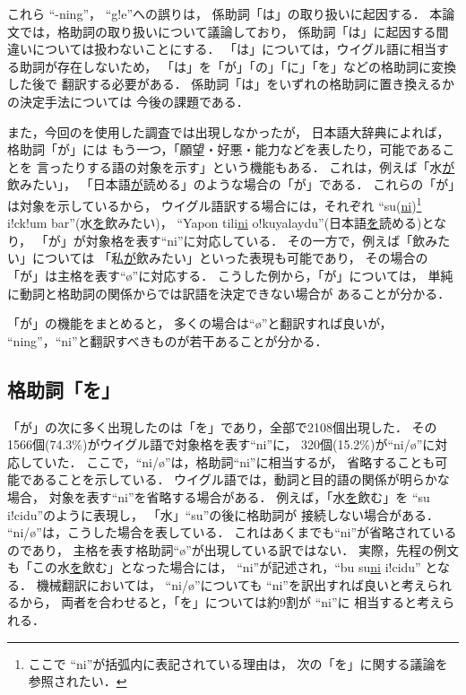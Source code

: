 これら ``-ning''， ``g!e''への誤りは，
係助詞「は」の取り扱いに起因する．
本論文では，格助詞の取り扱いについて議論しており，
係助詞「は」に起因する間違いについては扱わないことにする．
「は」については，ウイグル語に相当する助詞が存在しないため，
「は」を「が」「の」「に」「を」などの格助詞に変換した後で
翻訳する必要がある．
係助詞「は」をいずれの格助詞に置き換えるかの決定手法については
今後の課題である．

また，今回の\cite{IPAL}を使用した調査では出現しなかったが，
日本語大辞典\cite{GDIC}によれば，格助詞「が」には
もう一つ，「願望・好悪・能力などを表したり，可能であることを
言ったりする語の対象を示す」という機能もある．
これは，例えば「水\underline{が}飲みたい」，
「日本語\underline{が}読める」のような場合の「が」である．
これらの「が」は対象を示しているから，
ウイグル語訳する場合には，それぞれ
``su(\underline{ni})\footnote{ここで ``ni''が括弧内に表記されている理由は，
次の「を」に関する議論を参照されたい．}
 i!ck!um bar''(水\underline{を}飲みたい)，
``Yapon tili\underline{ni} 
o!kuyalaydu''(日本語\underline{を}読める)となり，
「が」が対象格を表す``ni''に対応している．
その一方で，例えば「飲みたい」については
「私\underline{が}飲みたい」といった表現も可能であり，
その場合の「が」は主格を表す``\o''に対応する．
こうした例から，「が」については，
単純に動詞と格助詞の関係からでは訳語を決定できない場合が
あることが分かる．

「が」の機能をまとめると，
多くの場合は``\o''と翻訳すれば良いが，
``ning''，``ni''と翻訳すべきものが若干あることが分かる．

\vspace{2pt}

\subsection{格助詞「を」}
\label{sec:wo}
「が」の次に多く出現したのは「を」であり，全部で2108個出現した．
その1566個(74.3\%)がウイグル語で対象格を表す``ni''に，
320個(15.2\%)が``ni/\o''に対応していた．
ここで，``ni/\o''は，格助詞``ni''に相当するが，
省略することも可能であることを示している．
ウイグル語では，動詞と目的語の関係が明らかな場合，
対象を表す``ni''を省略する場合がある．
例えば，「水\underline{を}飲む」を
``su i!cidu''のように表現し，
「水」``su''の後に格助詞が
接続しない場合がある．
``ni/\o''は，こうした場合を表している．
これはあくまでも``ni''が省略されているのであり，
主格を表す格助詞``\o''が出現している訳ではない．
実際，先程の例文も「この水\underline{を}飲む」となった場合には，
``ni''が記述され，``bu su\underline{ni} i!cidu''
となる．
機械翻訳においては，
``ni/\o''についても ``ni''を訳出すれば良いと考えられるから，
両者を合わせると，「を」については約9割が ``ni''に
相当すると考えられる．

